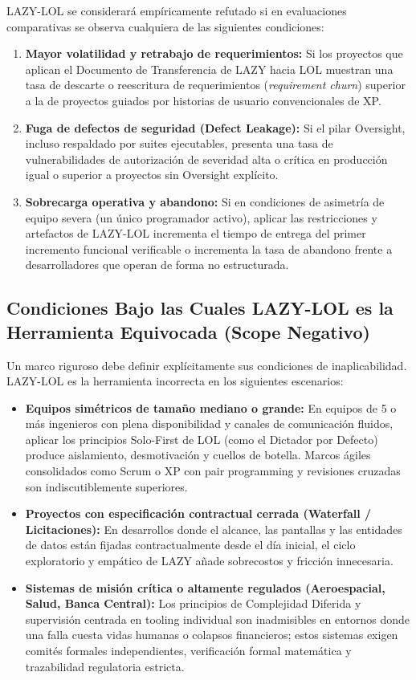 \documentclass[14pt,a4paper,oneside]{extbook}
\begin{document}
LAZY-LOL se considerará empíricamente refutado si en evaluaciones comparativas se observa cualquiera de las siguientes condiciones:
\begin{enumerate}
\item \textbf{Mayor volatilidad y retrabajo de requerimientos:} Si los proyectos que aplican el Documento de Transferencia de LAZY hacia LOL muestran una tasa de descarte o reescritura de requerimientos (\textit{requirement churn}) superior a la de proyectos guiados por historias de usuario convencionales de XP.
\item \textbf{Fuga de defectos de seguridad (Defect Leakage):} Si el pilar Oversight, incluso respaldado por suites ejecutables, presenta una tasa de vulnerabilidades de autorización de severidad alta o crítica en producción igual o superior a proyectos sin Oversight explícito.
\item \textbf{Sobrecarga operativa y abandono:} Si en condiciones de asimetría de equipo severa (un único programador activo), aplicar las restricciones y artefactos de LAZY-LOL incrementa el tiempo de entrega del primer incremento funcional verificable o incrementa la tasa de abandono frente a desarrolladores que operan de forma no estructurada.
\end{enumerate}

\subsection{Condiciones Bajo las Cuales LAZY-LOL es la Herramienta Equivocada (Scope Negativo)}

Un marco riguroso debe definir explícitamente sus condiciones de inaplicabilidad. LAZY-LOL es la herramienta incorrecta en los siguientes escenarios:
\begin{itemize}
\item \textbf{Equipos simétricos de tamaño mediano o grande:} En equipos de 5 o más ingenieros con plena disponibilidad y canales de comunicación fluidos, aplicar los principios Solo-First de LOL (como el Dictador por Defecto) produce aislamiento, desmotivación y cuellos de botella. Marcos ágiles consolidados como Scrum o XP con pair programming y revisiones cruzadas son indiscutiblemente superiores.
\item \textbf{Proyectos con especificación contractual cerrada (Waterfall / Licitaciones):} En desarrollos donde el alcance, las pantallas y las entidades de datos están fijadas contractualmente desde el día inicial, el ciclo exploratorio y empático de LAZY añade sobrecostos y fricción innecesaria.
\item \textbf{Sistemas de misión crítica o altamente regulados (Aeroespacial, Salud, Banca Central):} Los principios de Complejidad Diferida y supervisión centrada en tooling individual son inadmisibles en entornos donde una falla cuesta vidas humanas o colapsos financieros; estos sistemas exigen comités formales independientes, verificación formal matemática y trazabilidad regulatoria estricta.
\end{itemize}
\end{document}
